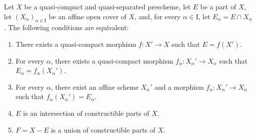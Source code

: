 \begin{proposition}[1.9.3]
\label{IV.1.9.3}
Let $X$ be a quasi-compact and quasi-separated prescheme, let $E$ be a part of $X$, let $(X_\alpha)_{\alpha\in\mathrm{I}}$ be an affine open cover of $X$, and, for every $\alpha\in\mathrm{I}$, let $E_\alpha=E\cap X_\alpha$.
The following conditions are equivalent:
\begin{enumerate}
  \item[a)] There exists a quasi-compact morphism $f:X'\to X$ such that $E=f(X')$.
  \item[a$'$)] For every $\alpha$, there exists a quasi-compact morphism $f_\alpha:X_\alpha'\to X_\alpha$ such that $E_\alpha=f_\alpha(X_\alpha')$.
  \item[a$''$)] For every $\alpha$, there exist an affine scheme $X_\alpha'$ and a morphism $f_\alpha:X_\alpha'\to X_\alpha$ such that $f_\alpha(X_\alpha')=E_\alpha$.
  \item[b)] $E$ is an intersection of constructible parts of $X$.
  \item[b$'$)] $F=X-E$ is a union of constructible parts of $X$.
\end{enumerate}
\end{proposition}

